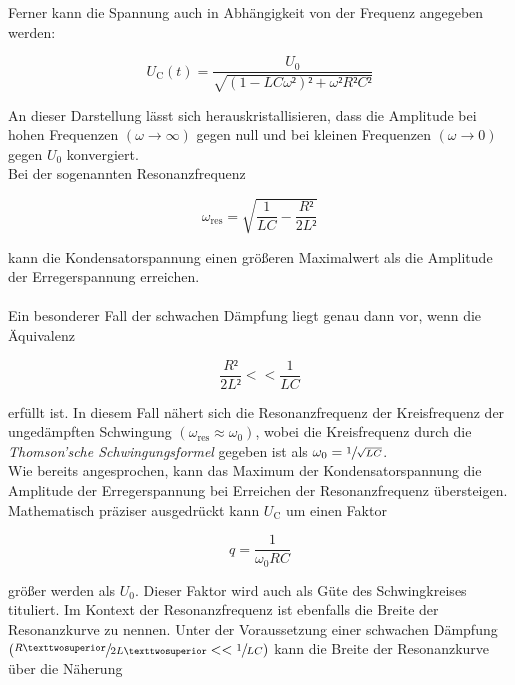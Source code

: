 \noindent Ferner kann die Spannung auch in Abhängigkeit von der Frequenz angegeben werden:

\begin{equation*}
    U_\text{C}(t) = \frac{U_0}{\sqrt{\left(1 - LC\omega²\right)² + \omega²R²C²}}
\end{equation*}

\noindent An dieser Darstellung lässt sich herauskristallisieren, dass die Amplitude bei hohen Frequenzen 
$\left(\omega \rightarrow \infty\right)$ gegen null und bei kleinen Frequenzen $\left(\omega \rightarrow 0\right)$ 
gegen $U_0$ konvergiert. \\
Bei der sogenannten Resonanzfrequenz 

\begin{equation*}
    \omega_\text{res} = \sqrt{\frac{1}{LC} - \frac{R²}{2L²}}
\end{equation*}

\noindent kann die Kondensatorspannung einen größeren Maximalwert als die Amplitude der Erregerspannung erreichen.\\\\
Ein besonderer Fall der schwachen Dämpfung liegt genau dann vor, wenn die Äquivalenz  

\begin{equation*}
    \frac{R²}{2L²} << \frac{1}{LC}
\end{equation*}

\noindent erfüllt ist. In diesem Fall nähert sich die Resonanzfrequenz der Kreisfrequenz der ungedämpften Schwingung
$(\omega_\text{res} \approx \omega_0)$, wobei die Kreisfrequenz durch die \emph{Thomson'sche Schwingungsformel}\cite{Thomson}
gegeben ist als $\omega_0 = \sfrac{1}{\sqrt{LC}}$.\\
Wie bereits angesprochen, kann das Maximum der Kondensatorspannung die Amplitude der Erregerspannung bei Erreichen der 
Resonanzfrequenz übersteigen. Mathematisch präziser ausgedrückt kann $U_\text{C}$ um einen Faktor

\begin{equation*}
    q = \frac{1}{\omega_{0}RC}
\end{equation*}

\noindent größer werden als $U_0$. Dieser Faktor wird auch als Güte des Schwingkreises tituliert. Im Kontext der Resonanzfrequenz ist 
ebenfalls die Breite der Resonanzkurve zu nennen. Unter der Voraussetzung einer schwachen Dämpfung $\left(\sfrac{R²}{2L²} << \sfrac{1}{LC}\right)$
kann die Breite der Resonanzkurve über die Näherung


